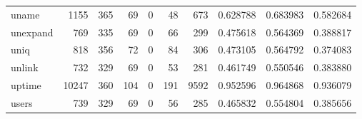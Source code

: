 \begin{tabular}{lrrrrrrrrr}
uname     &                                               1155 &                                                365 &                                                 69 &                                                  0 &                                                 48 &                                                673 &                                           0.628788 &                               0.683983 &                             0.582684 \\
unexpand  &                                                769 &                                                335 &                                                 69 &                                                  0 &                                                 66 &                                                299 &                                           0.475618 &                               0.564369 &                             0.388817 \\
uniq      &                                                818 &                                                356 &                                                 72 &                                                  0 &                                                 84 &                                                306 &                                           0.473105 &                               0.564792 &                             0.374083 \\
unlink    &                                                732 &                                                329 &                                                 69 &                                                  0 &                                                 53 &                                                281 &                                           0.461749 &                               0.550546 &                             0.383880 \\
uptime    &                                              10247 &                                                360 &                                                104 &                                                  0 &                                                191 &                                               9592 &                                           0.952596 &                               0.964868 &                             0.936079 \\
users     &                                                739 &                                                329 &                                                 69 &                                                  0 &                                                 56 &                                                285 &                                           0.465832 &                               0.554804 &                             0.385656 \\

\end{tabular}
